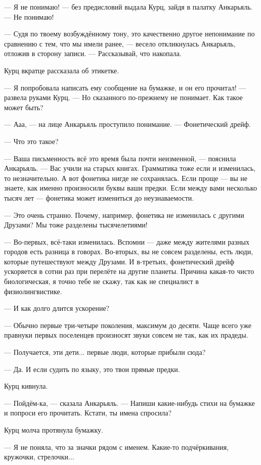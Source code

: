 \documentclass[a4paper,10pt,fleqn]{book}\usepackage{polyglossia}\setdefaultlanguage{english}\setotherlanguage{russian}\defaultfontfeatures{Ligatures=TeX,Mapping=tex-text}\usepackage{xcolor}\definecolor{lightgray}{HTML}{bbbbbb}\color{lightgray}\newcommand{\ml}[3]{\textcolor{black}{#3}}
\begin{document}
--- Я не понимаю! --- без предисловий выдала Курц, зайдя в палатку Анкарьяль.
--- Не понимаю!

--- Судя по твоему возбуждённому тону, это качественно другое непонимание по сравнению с тем, что мы имели ранее, --- весело откликнулась Анкарьяль, отложив в сторону записи.
--- Рассказывай, что накопала.

Курц вкратце рассказала об этикетке.

--- Я попробовала написать ему сообщение на бумажке, и он его прочитал! --- развела руками Курц.
--- Но сказанного по-прежнему не понимает.
Как такое может быть?

--- Ааа, --- на лице Анкарьяль проступило понимание.
--- Фонетический дрейф.

--- Что это такое?

--- Ваша письменность всё это время была почти неизменной, --- пояснила Анкарьяль.
--- Вас учили на старых книгах.
Грамматика тоже если и изменилась, то незначительно.
А вот фонетика нигде не сохранялась.
Если проще --- вы не знаете, как именно произносили буквы ваши предки.
Если между вами несколько тысяч лет --- фонетика может измениться до неузнаваемости.

--- Это очень странно.
Почему, например, фонетика не изменилась с другими Друзами?
Мы тоже разделены тысячелетиями!

--- Во-первых, всё-таки изменилась.
Вспомни --- даже между жителями разных городов есть разница в говорах.
Во-вторых, вы не совсем разделены, есть люди, которые путешествуют между Друзами.
И в-третьих, фонетический дрейф ускоряется в сотни раз при перелёте на другие планеты.
Причина какая-то чисто биологическая, я точно тебе не скажу, так как не специалист в физиолингвистике.

--- И как долго длится ускорение?

--- Обычно первые три-четыре поколения, максимум до десяти.
Чаще всего уже правнуки первых поселенцев произносят звуки совсем не так, как их прадеды.

--- Получается, эти дети... первые люди, которые прибыли сюда?

--- Да.
И если судить по языку, это твои прямые предки.

Курц кивнула.

--- Пойдём-ка, --- сказала Анкарьяль.
--- Напиши какие-нибудь стихи на бумажке и попроси его прочитать.
Кстати, ты имена спросила?

Курц молча протянула бумажку.

--- Я не поняла, что за значки рядом с именем.
Какие-то подчёркивания, кружочки, стрелочки...
\end{document}
